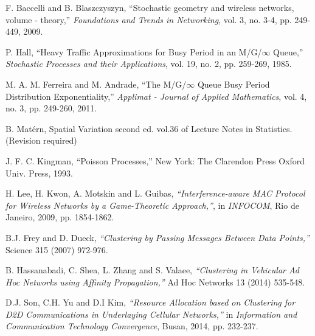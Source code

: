 \documentclass[10pt, conference, letterpaper]{IEEEtran}
\newcommand*{\Rom}[1]{\uppercase\expandafter{\romannumeral #1\relax}} %
\begin{document}
\begin{thebibliography}{50}
F. Baccelli and B. Blaszczyszyn, ``Stochastic geometry and wireless networks, volume \Rom{1} - theory,'' \emph{Foundations and Trends in Networking}, vol. 3, no. 3-4, pp. 249-449, 2009.

P. Hall, ``Heavy Traffic Approximations for Busy Period in an M/G/$\infty$ Queue,'' \emph{Stochastic Processes and their Applications}, vol. 19, no. 2, pp. 259-269, 1985.

M. A. M. Ferreira and M. Andrade, ``The M/G/$\infty$ Queue Busy Period Distribution Exponentiality,'' \emph{Applimat - Journal of Applied Mathematics}, vol. 4, no. 3, pp. 249-260, 2011.


B. Mat\'ern, Spatial Variation second ed. vol.36 of Lecture Notes in Statistics. (Revision required)

J. F. C. Kingman, ``Poisson Processes,'' New York: The Clarendon Press Oxford Univ. Press, 1993.


H. Lee, H. Kwon, A. Motskin and  L. Guibas, \emph{``Interference-aware MAC Protocol for Wireless Networks by a Game-Theoretic Approach,''}, in \emph{INFOCOM}, Rio de Janeiro, 2009, pp. 1854-1862.

B.J. Frey and D. Dueck, \emph{``Clustering by Passing Messages Between Data Points,''} Science 315 (2007) 972-976.

B. Hassanabadi, C. Shea, L. Zhang and S. Valaee, \emph{``Clustering in Vehicular Ad Hoc Networks using Affinity Propagation,''} Ad Hoc Networks 13 (2014) 535-548.

D.J. Son, C.H. Yu and D.I Kim, \emph{``Resource Allocation based on Clustering for D2D Communications in Underlaying Cellular Networks,''} in \emph{Information and Communication Technology Convergence}, Busan, 2014, pp. 232-237.

\end{thebibliography}
\end{document}
